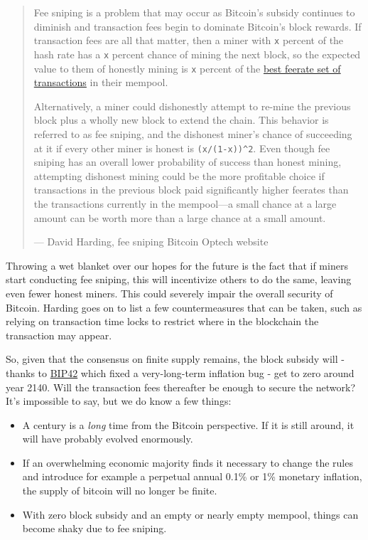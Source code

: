 \begin{quote}
Fee sniping is a problem that may occur as Bitcoin's subsidy continues
to diminish and transaction fees begin to dominate Bitcoin's block
rewards. If transaction fees are all that matter, then a miner with
\texttt{x} percent of the hash rate has a \texttt{x} percent chance of
mining the next block, so the expected value to them of honestly mining
is \texttt{x} percent of the
\href{https://bitcoinops.org/en/newsletters/2021/06/02/\#candidate-set-based-csb-block-template-construction}{best
feerate set of transactions} in their mempool.

Alternatively, a miner could dishonestly attempt to re-mine the previous
block plus a wholly new block to extend the chain. This behavior is
referred to as fee sniping, and the dishonest miner's chance of
succeeding at it if every other miner is honest is
\texttt{(x/(1-x))\^{}2}. Even though fee sniping has an overall lower
probability of success than honest mining, attempting dishonest mining
could be the more profitable choice if transactions in the previous
block paid significantly higher feerates than the transactions currently
in the mempool---a small chance at a large amount can be worth more than
a large chance at a small amount.

---  David Harding, fee sniping Bitcoin Optech website
\end{quote}

Throwing a wet blanket over our hopes for the future is the fact that if
miners start conducting fee sniping, this will incentivize others to do
the same, leaving even fewer honest miners. This could severely impair
the overall security of Bitcoin. Harding goes on to list a few
countermeasures that can be taken, such as relying on transaction time
locks to restrict where in the blockchain the transaction may appear.

So, given that the consensus on finite supply remains, the block subsidy
will - thanks to
\href{https://github.com/bitcoin/bips/blob/master/bip-0042.mediawiki}{BIP42}
which fixed a very-long-term inflation bug - get to zero around year
2140. Will the transaction fees thereafter be enough to secure the
network? It's impossible to say, but we do know a few things:

\begin{itemize}
\item
  A century is a \emph{long} time from the Bitcoin perspective. If it is
  still around, it will have probably evolved enormously.
\item
  If an overwhelming economic majority finds it necessary to change the
  rules and introduce for example a perpetual annual 0.1\% or 1\%
  monetary inflation, the supply of bitcoin will no longer be finite.
\item
  With zero block subsidy and an empty or nearly empty mempool, things
  can become shaky due to fee sniping.
\end{itemize}

